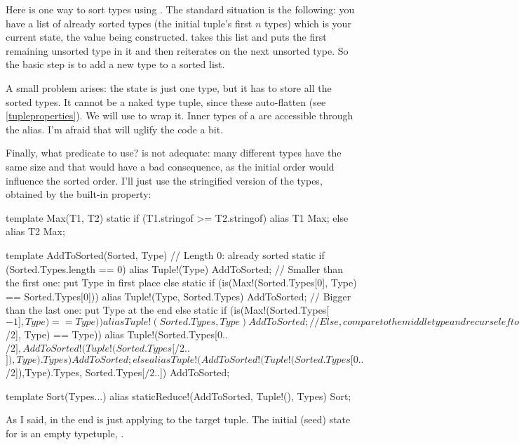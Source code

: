 Here is one way to sort types using . The standard situation is the following: you have a list of already sorted types (the initial tuple's first $n$ types) which is your current state, the value being constructed.  takes this list and puts the first remaining unsorted type in it and then reiterates on the next unsorted type. So the basic step is to add a new type to a sorted list. 

A small problem arises: the state is just one type, but it has to store all the sorted types. It cannot be a naked type tuple, since these auto-flatten (see \ref{tupleproperties}). We will use  to wrap it. Inner types of a  are accessible through the  alias. I'm afraid that will uglify the code a bit.

Finally, what predicate to use?  is not adequate: many different types have the same size and that would have a bad consequence, as the initial order would influence the sorted order. I'll just use the stringified version of the types, obtained by the built-in  property:


\begin{dcode}
template Max(T1, T2)
{
    static if (T1.stringof >= T2.stringof)
        alias T1 Max;
    else
        alias T2 Max;
}

template AddToSorted(Sorted, Type)
{
// Length 0: already sorted
    static if (Sorted.Types.length == 0)
        alias Tuple!(Type) AddToSorted;
// Smaller than the first one: put Type in first place
    else static if (is(Max!(Sorted.Types[0], Type) == Sorted.Types[0]))
        alias Tuple!(Type, Sorted.Types) AddToSorted;
// Bigger than the last one: put Type at the end
    else static if (is(Max!(Sorted.Types[$-1], Type) == Type))
        alias Tuple!(Sorted.Types, Type) AddToSorted;
// Else, compare to the middle type and recurse left or right of it
    else static if (is(Max!(Sorted.Types[$/2], Type) == Type))
        alias Tuple!(Sorted.Types[0..$/2],
                     AddToSorted!(Tuple!(Sorted.Types[$/2..$]),Type).Types)
              AddToSorted;
    else
        alias Tuple!(AddToSorted!(Tuple!(Sorted.Types[0..$/2]),Type).Types,
                     Sorted.Types[$/2..$])
              AddToSorted;    
}

template Sort(Types...)
{
    alias staticReduce!(AddToSorted, Tuple!(), Types) Sort;
}
\end{dcode}

As I said, in the end  is just applying  to the target tuple. The initial (seed) state for  is an empty typetuple, .

